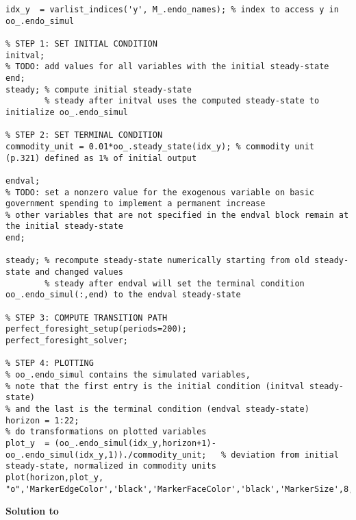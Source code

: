 {\footnotesize
\begin{lstlisting}[style=Matlab-editor,basicstyle=\mlttfamily\scriptsize]
idx_y  = varlist_indices('y', M_.endo_names); % index to access y in oo_.endo_simul

% STEP 1: SET INITIAL CONDITION
initval;
% TODO: add values for all variables with the initial steady-state
end;
steady; % compute initial steady-state
        % steady after initval uses the computed steady-state to initialize oo_.endo_simul

% STEP 2: SET TERMINAL CONDITION
commodity_unit = 0.01*oo_.steady_state(idx_y); % commodity unit (p.321) defined as 1% of initial output

endval;
% TODO: set a nonzero value for the exogenous variable on basic government spending to implement a permanent increase
% other variables that are not specified in the endval block remain at the initial steady-state
end;

steady; % recompute steady-state numerically starting from old steady-state and changed values
        % steady after endval will set the terminal condition oo_.endo_simul(:,end) to the endval steady-state

% STEP 3: COMPUTE TRANSITION PATH
perfect_foresight_setup(periods=200);
perfect_foresight_solver;

% STEP 4: PLOTTING
% oo_.endo_simul contains the simulated variables,
% note that the first entry is the initial condition (initval steady-state)
% and the last is the terminal condition (endval steady-state)
horizon = 1:22;
% do transformations on plotted variables
plot_y  = (oo_.endo_simul(idx_y,horizon+1)-oo_.endo_simul(idx_y,1))./commodity_unit;   % deviation from initial steady-state, normalized in commodity units
plot(horizon,plot_y, "o",'MarkerEdgeColor','black','MarkerFaceColor','black','MarkerSize',8,'LineStyle','none');

\end{lstlisting}
}%

\begin{solution}\textbf{Solution to }
\ifDisplaySolutions%

\fi
\newpage
\end{solution}